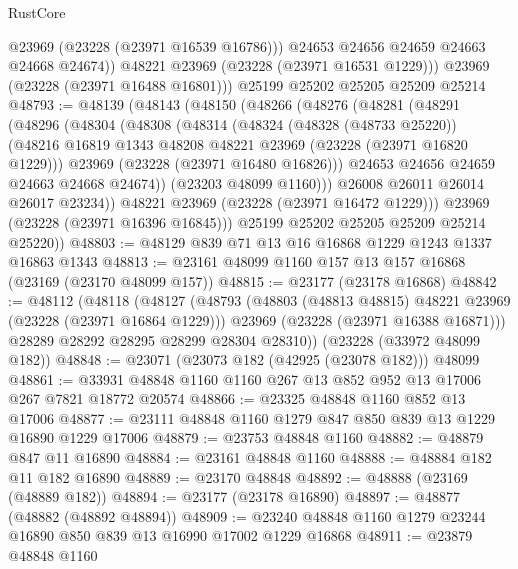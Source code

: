 \begin{lexlean}{RustCore}
\begin{coremodule}
              @23969
              (@23228 (@23971 @16539 @16786)))
            @24653
            @24656
            @24659
            @24663
            @24668
            @24674))
        @48221
        @23969
        (@23228 (@23971 @16531 @1229)))
      @23969
      (@23228 (@23971 @16488 @16801)))
    @25199
    @25202
    @25205
    @25209
    @25214
@48793 := @48139
    (@48143
      (@48150
        (@48266
          (@48276
            (@48281
              (@48291
                (@48296
                  (@48304
                    (@48308
                      (@48314
                        (@48324
                          (@48328 (@48733 @25220))
                          (@48216 @16819 @1343 @48208 @48221 @23969 (@23228 (@23971 @16820 @1229)))
                          @23969
                          (@23228 (@23971 @16480 @16826)))
                        @24653
                        @24656
                        @24659
                        @24663
                        @24668
                        @24674))
                    (@23203 @48099 @1160)))
                @26008
                @26011
                @26014
                @26017
                @23234))
            @48221
            @23969
            (@23228 (@23971 @16472 @1229)))
          @23969
          (@23228 (@23971 @16396 @16845)))
        @25199
        @25202
        @25205
        @25209
        @25214
        @25220))
@48803 := @48129 @839 @71 @13 @16 @16868 @1229 @1243 @1337 @16863 @1343
@48813 := @23161 @48099 @1160 @157 @13 @157 @16868 (@23169 (@23170 @48099 @157))
@48815 := @23177 (@23178 @16868)
@48842 := @48112
    (@48118
      (@48127
        (@48793
          (@48803 (@48813 @48815) @48221 @23969 (@23228 (@23971 @16864 @1229)))
          @23969
          (@23228 (@23971 @16388 @16871)))
        @28289
        @28292
        @28295
        @28299
        @28304
        @28310))
    (@23228 (@33972 @48099 @182))
@48848 := @23071 (@23073 @182 (@42925 (@23078 @182))) @48099
@48861 := @33931 @48848 @1160 @1160 @267 @13 @852 @952 @13 @17006 @267 @7821 @18772 @20574
@48866 := @23325 @48848 @1160 @852 @13 @17006
@48877 := @23111 @48848 @1160 @1279 @847 @850 @839 @13 @1229 @16890 @1229 @17006
@48879 := @23753 @48848 @1160
@48882 := @48879 @847 @11 @16890
@48884 := @23161 @48848 @1160
@48888 := @48884 @182 @11 @182 @16890
@48889 := @23170 @48848
@48892 := @48888 (@23169 (@48889 @182))
@48894 := @23177 (@23178 @16890)
@48897 := @48877 (@48882 (@48892 @48894))
@48909 := @23240 @48848 @1160 @1279 @23244 @16890 @850 @839 @13 @16990 @17002 @1229 @16868
@48911 := @23879 @48848 @1160

\end{coremodule}
\end{lexlean}

